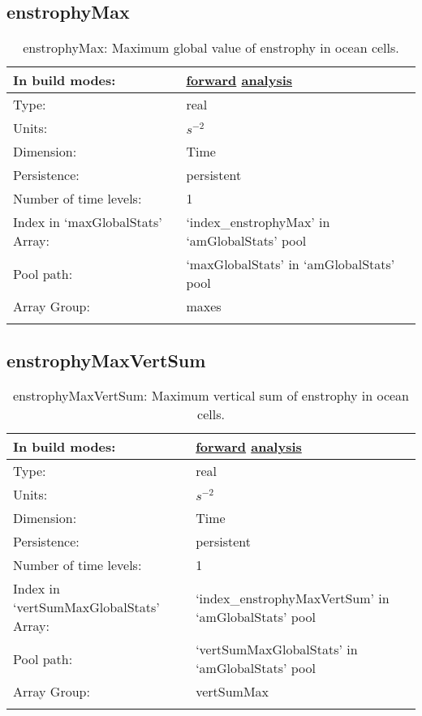 \subsection[enstrophyMax]{enstrophyMax}
\label{subsec:var_sec_amGlobalStats_enstrophyMax}
\begin{center}
\begin{longtable}{| p{2.0in} | p{4.0in} |}
        \hline 
        In build modes: & \hyperref[subsec:forward_var_tab_amGlobalStats]{forward} \hyperref[subsec:analysis_var_tab_amGlobalStats]{analysis} \\
        \hline 
        Type: & real \\
        \hline 
        Units: & $s^{-2}$ \\
        \hline 
        Dimension: & Time \\
        \hline 
        Persistence: & persistent \\
        \hline 
        Number of time levels: & 1 \\
        \hline 
		 Index in `maxGlobalStats' Array: & `index\_enstrophyMax' in `amGlobalStats' pool \\
		 \hline 
            Pool path: & `maxGlobalStats' in `amGlobalStats' pool \\
		 \hline 
		 Array Group: & maxes \\
		 \hline 
    \caption{enstrophyMax: Maximum global value of enstrophy in ocean cells.}
\end{longtable}
\end{center}
\subsection[enstrophyMaxVertSum]{enstrophyMaxVertSum}
\label{subsec:var_sec_amGlobalStats_enstrophyMaxVertSum}
\begin{center}
\begin{longtable}{| p{2.0in} | p{4.0in} |}
        \hline 
        In build modes: & \hyperref[subsec:forward_var_tab_amGlobalStats]{forward} \hyperref[subsec:analysis_var_tab_amGlobalStats]{analysis} \\
        \hline 
        Type: & real \\
        \hline 
        Units: & $s^{-2}$ \\
        \hline 
        Dimension: & Time \\
        \hline 
        Persistence: & persistent \\
        \hline 
        Number of time levels: & 1 \\
        \hline 
		 Index in `vertSumMaxGlobalStats' Array: & `index\_enstrophyMaxVertSum' in `amGlobalStats' pool \\
		 \hline 
            Pool path: & `vertSumMaxGlobalStats' in `amGlobalStats' pool \\
		 \hline 
		 Array Group: & vertSumMax \\
		 \hline 
    \caption{enstrophyMaxVertSum: Maximum vertical sum of enstrophy in ocean cells.}
\end{longtable}
\end{center}
